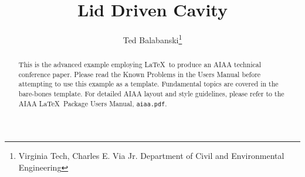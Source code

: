 \documentclass[]{aiaa-tc}%
\title{Lid Driven Cavity}
\author{ Ted Balabanski\thanks{Virginia Tech, Charles E. Via Jr. Department of Civil and Environmental Engineering} }
\newcommand{\file}[1]{\texttt{#1}}
\begin{document}
\maketitle


\begin{abstract}
This is the advanced example employing \LaTeX\ to produce an AIAA
technical conference paper.
Please read the Known Problems in the Users Manual before attempting
to use this example as a template.
Fundamental topics are covered in the bare-bones template.
For detailed AIAA layout and style guidelines, please refer to the AIAA
\LaTeX\ Package Users Manual, \file{aiaa.pdf}.
\end{abstract}
\end{document}
